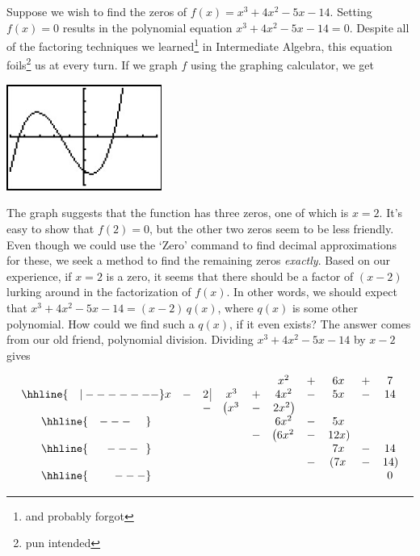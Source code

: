 

\setcounter{footnote}{0}

\label{Polydivision}


Suppose we wish to find the zeros of $f(x) = x^3 + 4x^2-5x-14$.  Setting $f(x)=0$ results in the polynomial equation $x^3 + 4x^2-5x-14=0$.   Despite all of the factoring techniques we learned\footnote{and probably forgot} in Intermediate Algebra, this equation foils\footnote{pun intended} us at every turn.  If we graph $f$ using the graphing calculator, we get

\smallskip

\centerline{\includegraphics[width=2in]{./PolynomialsGraphics/PolyDiv01.jpg}}

\smallskip

The graph suggests that the function has three zeros, one of which is $x=2$.  It's easy to show that $f(2) = 0$, but the other two zeros seem to be less friendly.  Even though we could use the `Zero' command to find decimal approximations for these, we seek a method to find the remaining zeros \emph{exactly}.  Based on our experience, if $x=2$ is a zero, it seems that there should be a factor of $(x-2)$ lurking around in the factorization of $f(x)$.  In other words, we should expect that $x^3 + 4x^2-5x-14=(x-2) \, q(x)$, where $q(x)$ is some other polynomial.  How could we find such a $q(x)$, if it even exists?  The answer comes from our old friend, polynomial division. Dividing $x^3 + 4x^2-5x-14$ by $x-2$ gives

\setlength\arraycolsep{0.1pt}
\setlength\extrarowheight{2pt}

\[ \begin{array}{cccccccccc}

& & & & & x^2 & + & 6x & + & 7 \\ \hhline{~~~|-------}

x & - & 2 \, \vline& x^3 & + & 4x^2 & - & 5x & - & 14 \\

 &  &  -& \left(x^3 \right. & - & \left.  2x^2\right) &  &  &  &  \\ \hhline{~~~---~~~~} 
 &  &  &   &  & 6 x^2 & - & 5x &  &  \\ 
 &  &  &   & - & \left(6 x^2 \right. & - & \left. 12x \right) &  &  \\ \hhline{~~~~~---~~} 
 &  &  &   &   &  & & 7x  & - & 14 \\
 &  &  &   &   &  & - & \left( 7x \right. & - & \left. 14 \right) \\ \hhline{~~~~~~~---} 
 &   &  &  &  &  &  &  &  & 0
 
\end{array}\]

